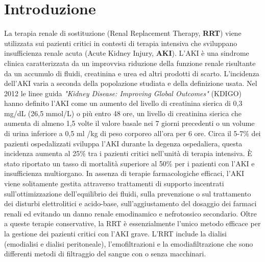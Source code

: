 \chapter{Introduzione}

La terapia renale di sostituzione (Renal Replacement Therapy, \textbf{RRT}) viene utilizzata sui pazienti critici in contesti di terapia intensiva che sviluppano insufficienza renale acuta (Acute Kidney Injury, \textbf{AKI}).
L'AKI è una sindrome clinica caratterizzata da un improvvisa riduzione della funzione renale risultante da un accumulo di fluidi, creatinina e urea ed altri prodotti di scarto. L'incidenza dell'AKI varia a seconda della popolazione studiata e della definizione usata. Nel 2012 le linee guida \textit{"Kidney Disease: Improving Global Outcomes"} (KDIGO) hanno definito l'AKI come un aumento del livello di creatinina sierica di 0,3 mg/dL (26,5 mmol/L) o più entro 48 ore, un livello di creatinina sierica che  aumenta di almeno 1,5 volte il valore basale nei 7 giorni precedenti o un volume di urina inferiore a 0,5 ml /kg di peso corporeo all'ora per 6 ore.
Circa il 5-7\% dei pazienti ospedalizzati sviluppa l'AKI durante la degenza ospedaliera, questa incidenza aumenta al 25\% tra i pazienti critici nell'unità di terapia intensiva\cite{tolwani2012continuous,uchino2005acute}.
È stato riportato un tasso di mortalità superiore al 50\% per i pazienti con l'AKI e insufficienza multiorgano\cite{uchino2005acute}.
In assenza di terapie farmacologiche efficaci, l'AKI viene solitamente gestita attraverso trattamenti di supporto incentrati sull'ottimizzazione dell'equilibrio dei  fluidi, sulla prevenzione o sul trattamento dei disturbi elettrolitici e acido-base, sull'aggiustamento del dosaggio dei farmaci renali ed evitando un danno renale emodinamico e nefrotossico secondario.
Oltre a queste terapie conservative, la RRT è essenzialmente l'unico metodo efficace per la gestione dei pazienti critici con l'AKI grave\cite{villa2015renal}. 
L'RRT include la dialisi (emodialisi e dialisi peritoneale), l'emofiltrazioni e la emodiafiltrazione che sono differenti metodi di filtraggio del sangue con o senza macchinari\cite{tiglis2022overview}.

